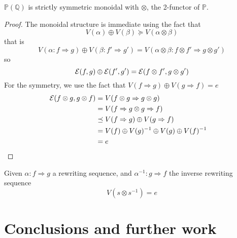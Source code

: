 \documentclass[a4paper]{article}
\begin{document}
\begin{proposition}
$\mathbb{P}(\mathbb{Q})$ is strictly symmetric monoidal with $\otimes$, the
  2-functor of $\mathbb{P}$.

\begin{proof}
The monoidal structure is immediate using the fact that
\[
V(\alpha) \oplus V(\beta) \succeq V(\alpha \otimes \beta)
\]
that is
\[
V(\alpha: f \Rightarrow g) \oplus V(\beta: f' \Rightarrow g') = V(\alpha \otimes
  \beta: f \otimes f' \Rightarrow g \otimes g')
\]
so
\[
{\cal E}(f, g) \oplus {\cal E}(f', g') = {\cal E}(f \otimes f', g \otimes g')
\]
For the symmetry, we use the fact that $V(f \Rightarrow g) \oplus V(g
  \Rightarrow f) = e$
\begin{align}
{\cal E}(f \otimes g, g \otimes f) &= V(f \otimes g \Rightarrow g \otimes g) \cr
&= V(f \Rightarrow g \otimes g \Rightarrow f) \cr
&\preceq V(f \Rightarrow g) \oplus V(g \Rightarrow f) \cr
&= V(f) \oplus V(g)^{-1} \oplus V(g) \oplus V(f)^{-1} \cr
&= e
\end{align}
\end{proof}
\end{proposition}

\begin{corollary}
Given $\alpha: f \Rightarrow g$ a rewriting sequence, and $\alpha^{-1}: g
  \Rightarrow f$ the inverse rewriting sequence
\[
V(s \otimes s^{-1}) = e
\]
\end{corollary}


\section{Conclusions and further work}
\label{sec:conclusion}



\small

\end{document}
